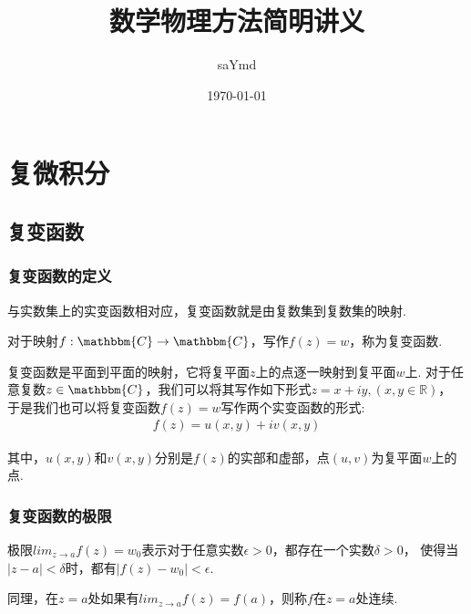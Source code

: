 \documentclass[lang=cn, titlestyle=display, scheme=chinese]{elegantbook}
\title{数学物理方法简明讲义}
\author{saYmd}
\date{\today}
\begin{document}
    \maketitle
    \tableofcontents

    \chapter{复微积分}
        \section{复变函数}
            \subsection{复变函数的定义}
                与实数集上的实变函数相对应，复变函数就是由复数集到复数集的映射.\par
                \begin{definition}[复变函数]\label{def:complex_function}
                    对于映射$f: \mathbbm{C} \to \mathbbm{C}$，写作$f(z)=w$，称为复变函数.
                \end{definition}

                复变函数是平面到平面的映射，它将复平面$z$上的点逐一映射到复平面$w$上.
                对于任意复数$z \in \mathbbm{C}$，我们可以将其写作如下形式$z = x + iy,(x,y \in \mathbb{R})$，
                于是我们也可以将复变函数$f(z) = w$写作两个实变函数的形式:
                \begin{align}
                    f(z) = u(x,y) + iv(x,y)
                \end{align}

                其中，$u(x,y)$和$v(x,y)$分别是$f(z)$的实部和虚部，点$(u, v)$为复平面$w$上的点.

            \subsection{复变函数的极限}
                \begin{definition}[复变函数的极限]\label{def:limits_of_complex_function}
                    极限$lim_{z \to a}f(z) = w_0$表示对于任意实数$\epsilon > 0$，都存在一个实数$\delta > 0$，
                    使得当$|z - a| < \delta$时，都有$|f(z) - w_0| < \epsilon$.
                \end{definition}

                \begin{definition}[复变函数的连续性]\label{def:continuity_of_complex_function}
                    同理，在$z = a$处如果有$lim_{z \to a}f(z) = f(a)$，则称$f$在$z = a$处连续.
                \end{definition}
\end{document}
